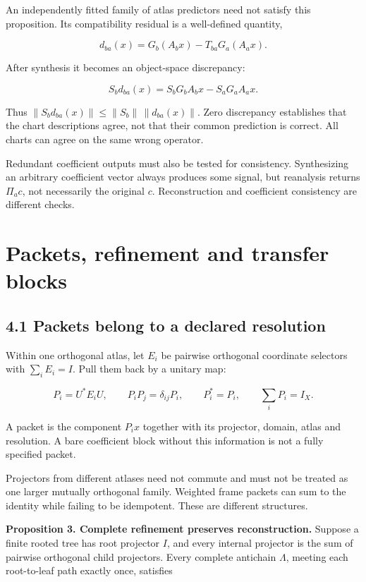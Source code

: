 An independently fitted family of atlas predictors need not satisfy this
proposition. Its compatibility residual is a well-defined quantity,

\[
d_{ba}(x)=G_b(A_bx)-T_{ba}G_a(A_ax).
\]

After synthesis it becomes an object-space discrepancy:

\[
S_bd_{ba}(x)=S_bG_bA_bx-S_aG_aA_ax.
\]

Thus \(\|S_bd_{ba}(x)\|\leq\|S_b\|\,\|d_{ba}(x)\|\). Zero discrepancy
establishes that the chart descriptions agree, not that their common
prediction is correct. All charts can agree on the same wrong operator.

Redundant coefficient outputs must also be tested for consistency.
Synthesizing an arbitrary coefficient vector always produces some
signal, but reanalysis returns \(\Pi_ac\), not necessarily the original
\(c\). Reconstruction and coefficient consistency are different checks.

\section{Packets, refinement and transfer blocks}\label{LSM:packets-refinement-and-transfer-blocks}

\subsection{4.1 Packets belong to a declared
resolution}\label{LSM:packets-belong-to-a-declared-resolution}

Within one orthogonal atlas, let \(E_i\) be pairwise orthogonal
coordinate selectors with \(\sum_iE_i=I\). Pull them back by a unitary
map:

\[
P_i=U^*E_iU,\qquad P_iP_j=\delta_{ij}P_i,
\qquad P_i^*=P_i,\qquad\sum_iP_i=I_X.
\]

A packet is the component \(P_ix\) together with its projector, domain,
atlas and resolution. A bare coefficient block without this information
is not a fully specified packet.

Projectors from different atlases need not commute and must not be
treated as one larger mutually orthogonal family. Weighted frame packets
can sum to the identity while failing to be idempotent. These are
different structures.

\textbf{Proposition 3. Complete refinement preserves reconstruction.}
Suppose a finite rooted tree has root projector \(I\), and every
internal projector is the sum of pairwise orthogonal child projectors.
Every complete antichain \(\Lambda\), meeting each root-to-leaf path
exactly once, satisfies

